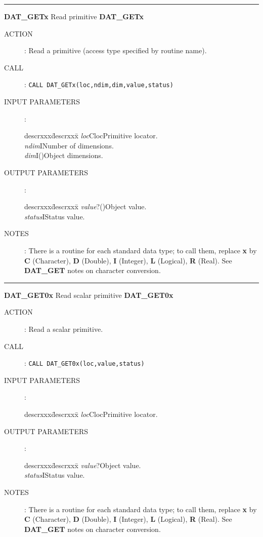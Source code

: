 \goodbreak
\rule{\textwidth}{0.3mm}
{\Large {\bf DAT\_GETx} \hfill Read primitive \hfill {\bf DAT\_GETx}}
\begin{description}
\item [ACTION]:
Read a primitive (access type specified by routine name).
\item [CALL]:
{\tt CALL DAT\_GETx(loc,ndim,dim,value,status)}
\item [INPUT PARAMETERS]:
\begin{tabbing}
descrxxx\=descrxxx\=\kill
{\em loc}\>Cloc\>Primitive locator.\\
{\em ndim}\>I\>Number of dimensions.\\
{\em dim}\>I()\>Object dimensions.
\end{tabbing}
\item [OUTPUT PARAMETERS]:
\begin{tabbing}
descrxxx\=descrxxx\=\kill
{\em value}\>?()\>Object value.\\
{\em status}\>I\>Status value.
\end{tabbing}
\item [NOTES]:
There is a routine for each standard data type; to call them, replace {\bf x}
by {\bf C} (Character), {\bf D} (Double), {\bf I} (Integer), {\bf L} (Logical),
{\bf R} (Real).
See {\bf DAT\_GET} notes on character conversion.
\end{description}
\goodbreak
\rule{\textwidth}{0.3mm}
{\Large {\bf DAT\_GET0x} \hfill Read scalar primitive \hfill {\bf DAT\_GET0x}}
\begin{description}
\item [ACTION]:
Read a scalar primitive.
\item [CALL]:
{\tt CALL DAT\_GET0x(loc,value,status)}
\item [INPUT PARAMETERS]:
\begin{tabbing}
descrxxx\=descrxxx\=\kill
{\em loc}\>Cloc\>Primitive locator.
\end{tabbing}
\item [OUTPUT PARAMETERS]:
\begin{tabbing}
descrxxx\=descrxxx\=\kill
{\em value}\>?\>Object value.\\
{\em status}\>I\>Status value.
\end{tabbing}
\item [NOTES]:
There is a routine for each standard data type; to call them, replace {\bf x}
by {\bf C} (Character), {\bf D} (Double), {\bf I} (Integer), {\bf L} (Logical),
{\bf R} (Real).
See {\bf DAT\_GET} notes on character conversion.
\end{description}
